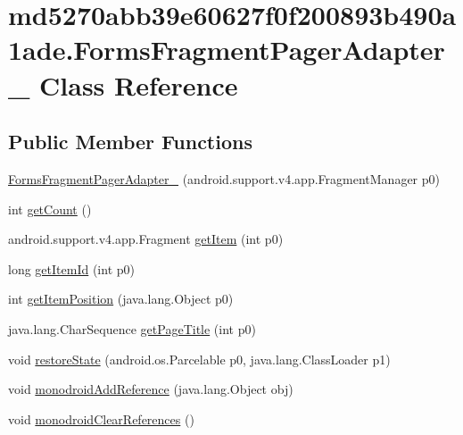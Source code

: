 \hypertarget{classmd5270abb39e60627f0f200893b490a1ade_1_1_forms_fragment_pager_adapter__1}{
\section{md5270abb39e60627f0f200893b490a1ade.FormsFragmentPagerAdapter\_ Class Reference}
\label{classmd5270abb39e60627f0f200893b490a1ade_1_1_forms_fragment_pager_adapter__1}
}
\subsection*{Public Member Functions}
\begin{CompactItemize}
\item 
\hyperlink{classmd5270abb39e60627f0f200893b490a1ade_1_1_forms_fragment_pager_adapter__1_7ac0bb4a65db4484306e06831a031fed}{FormsFragmentPagerAdapter\_} (android.support.v4.app.FragmentManager p0)
\item 
int \hyperlink{classmd5270abb39e60627f0f200893b490a1ade_1_1_forms_fragment_pager_adapter__1_99c77886073dcf2434e0cddd4ebe115f}{getCount} ()
\item 
android.support.v4.app.Fragment \hyperlink{classmd5270abb39e60627f0f200893b490a1ade_1_1_forms_fragment_pager_adapter__1_cf188451cd28b45334ab835440a9b510}{getItem} (int p0)
\item 
long \hyperlink{classmd5270abb39e60627f0f200893b490a1ade_1_1_forms_fragment_pager_adapter__1_d2678a16c4306513316cc5e3f973eb20}{getItemId} (int p0)
\item 
int \hyperlink{classmd5270abb39e60627f0f200893b490a1ade_1_1_forms_fragment_pager_adapter__1_35ec5c3083eb6db927bb57d51c05ed06}{getItemPosition} (java.lang.Object p0)
\item 
java.lang.CharSequence \hyperlink{classmd5270abb39e60627f0f200893b490a1ade_1_1_forms_fragment_pager_adapter__1_9e1d408fb9fe541bda794045eea74372}{getPageTitle} (int p0)
\item 
void \hyperlink{classmd5270abb39e60627f0f200893b490a1ade_1_1_forms_fragment_pager_adapter__1_1ca53f9ddc8aa628e82b453c1eecc15c}{restoreState} (android.os.Parcelable p0, java.lang.ClassLoader p1)
\item 
void \hyperlink{classmd5270abb39e60627f0f200893b490a1ade_1_1_forms_fragment_pager_adapter__1_87599b19cc33d84cefbf80e0b04fcfab}{monodroidAddReference} (java.lang.Object obj)
\item 
void \hyperlink{classmd5270abb39e60627f0f200893b490a1ade_1_1_forms_fragment_pager_adapter__1_5941647e9fc5cbd3d54d30eb23d50364}{monodroidClearReferences} ()
\end{CompactItemize}
